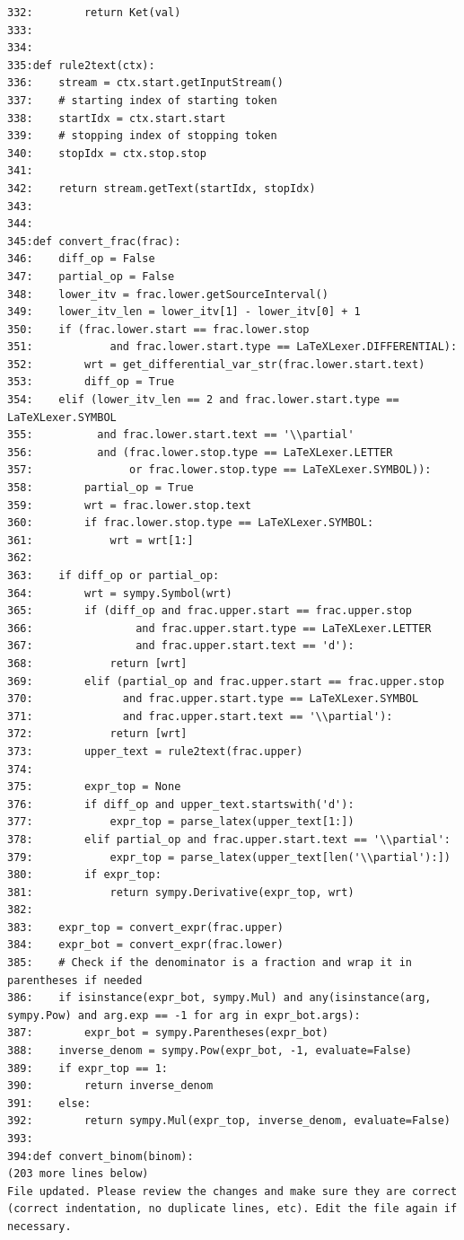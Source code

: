{\begin{observationbox}
\begin{Verbatim}[breaklines=true, breakanywhere=true]
332:        return Ket(val)
333:
334:
335:def rule2text(ctx):
336:    stream = ctx.start.getInputStream()
337:    # starting index of starting token
338:    startIdx = ctx.start.start
339:    # stopping index of stopping token
340:    stopIdx = ctx.stop.stop
341:
342:    return stream.getText(startIdx, stopIdx)
343:
344:
345:def convert_frac(frac):
346:    diff_op = False
347:    partial_op = False
348:    lower_itv = frac.lower.getSourceInterval()
349:    lower_itv_len = lower_itv[1] - lower_itv[0] + 1
350:    if (frac.lower.start == frac.lower.stop
351:            and frac.lower.start.type == LaTeXLexer.DIFFERENTIAL):
352:        wrt = get_differential_var_str(frac.lower.start.text)
353:        diff_op = True
354:    elif (lower_itv_len == 2 and frac.lower.start.type == LaTeXLexer.SYMBOL
355:          and frac.lower.start.text == '\\partial'
356:          and (frac.lower.stop.type == LaTeXLexer.LETTER
357:               or frac.lower.stop.type == LaTeXLexer.SYMBOL)):
358:        partial_op = True
359:        wrt = frac.lower.stop.text
360:        if frac.lower.stop.type == LaTeXLexer.SYMBOL:
361:            wrt = wrt[1:]
362:
363:    if diff_op or partial_op:
364:        wrt = sympy.Symbol(wrt)
365:        if (diff_op and frac.upper.start == frac.upper.stop
366:                and frac.upper.start.type == LaTeXLexer.LETTER
367:                and frac.upper.start.text == 'd'):
368:            return [wrt]
369:        elif (partial_op and frac.upper.start == frac.upper.stop
370:              and frac.upper.start.type == LaTeXLexer.SYMBOL
371:              and frac.upper.start.text == '\\partial'):
372:            return [wrt]
373:        upper_text = rule2text(frac.upper)
374:
375:        expr_top = None
376:        if diff_op and upper_text.startswith('d'):
377:            expr_top = parse_latex(upper_text[1:])
378:        elif partial_op and frac.upper.start.text == '\\partial':
379:            expr_top = parse_latex(upper_text[len('\\partial'):])
380:        if expr_top:
381:            return sympy.Derivative(expr_top, wrt)
382:
383:    expr_top = convert_expr(frac.upper)
384:    expr_bot = convert_expr(frac.lower)
385:    # Check if the denominator is a fraction and wrap it in parentheses if needed
386:    if isinstance(expr_bot, sympy.Mul) and any(isinstance(arg, sympy.Pow) and arg.exp == -1 for arg in expr_bot.args):
387:        expr_bot = sympy.Parentheses(expr_bot)
388:    inverse_denom = sympy.Pow(expr_bot, -1, evaluate=False)
389:    if expr_top == 1:
390:        return inverse_denom
391:    else:
392:        return sympy.Mul(expr_top, inverse_denom, evaluate=False)
393:
394:def convert_binom(binom):
(203 more lines below)
File updated. Please review the changes and make sure they are correct (correct indentation, no duplicate lines, etc). Edit the file again if necessary.


\end{Verbatim}
\end{observationbox}}
